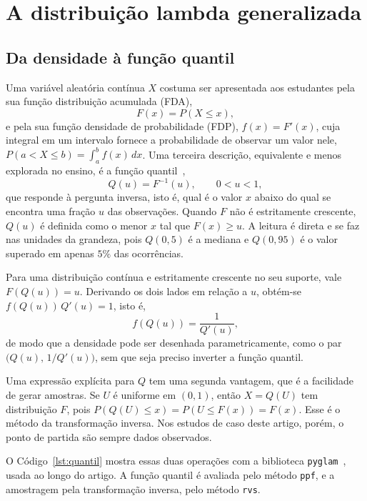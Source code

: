 \section{A distribuição lambda generalizada}\label{sec:gld}

\subsection{Da densidade à função quantil}

Uma variável aleatória contínua $X$ costuma ser apresentada aos estudantes pela sua função distribuição acumulada (FDA),
\begin{equation}
    F(x) = P(X \leq x),
\end{equation}
e pela sua função densidade de probabilidade (FDP), $f(x) = F'(x)$, cuja integral em um intervalo fornece a probabilidade de observar um valor nele, $P(a < X \leq b) = \int_a^b f(x)\,dx$. Uma terceira descrição, equivalente e menos explorada no ensino, é a função quantil~\cite{gilchrist2000},
\begin{equation}
    Q(u) = F^{-1}(u), \qquad 0 < u < 1,
    \label{eq:quantil}
\end{equation}
que responde à pergunta inversa, isto é, qual é o valor $x$ abaixo do qual se encontra uma fração $u$ das observações. Quando $F$ não é estritamente crescente, $Q(u)$ é definida como o menor $x$ tal que $F(x) \geq u$. A leitura é direta e se faz nas unidades da grandeza, pois $Q(0{,}5)$ é a mediana e $Q(0{,}95)$ é o valor superado em apenas $5\%$ das ocorrências.

Para uma distribuição contínua e estritamente crescente no seu suporte, vale $F(Q(u)) = u$. Derivando os dois lados em relação a $u$, obtém-se $f(Q(u))\,Q'(u) = 1$, isto é,
\begin{equation}
    f(Q(u)) = \frac{1}{Q'(u)},
    \label{eq:densidade_quantil}
\end{equation}
de modo que a densidade pode ser desenhada parametricamente, como o par $\big(Q(u),\, 1/Q'(u)\big)$, sem que seja preciso inverter a função quantil.

Uma expressão explícita para $Q$ tem uma segunda vantagem, que é a facilidade de gerar amostras. Se $U$ é uniforme em $(0,1)$, então $X = Q(U)$ tem distribuição $F$, pois $P(Q(U) \leq x) = P(U \leq F(x)) = F(x)$. Esse é o método da transformação inversa. Nos estudos de caso deste artigo, porém, o ponto de partida são sempre dados observados.

O Código~\ref{lst:quantil} mostra essas duas operações com a biblioteca \texttt{pyglam}~\cite{pyglam}, usada ao longo do artigo. A função quantil é avaliada pelo método \texttt{ppf}, e a amostragem pela transformação inversa, pelo método \texttt{rvs}.

